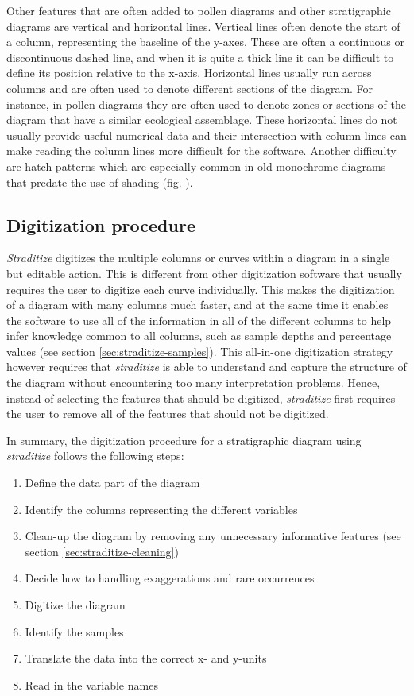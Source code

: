 \documentclass[
11pt, %
english, %
singlespacing, %
headsepline, %
]{MastersDoctoralThesis} %
\begin{document}
\begin{NoHyper}
\begin{refsection}
Other features that are often added to pollen diagrams and other stratigraphic diagrams are vertical and horizontal lines. Vertical lines often denote the start of a column, representing the baseline of the y-axes. These are often a continuous or discontinuous dashed line, and when it is quite a thick line it can be difficult to define its position relative to the x-axis. Horizontal lines usually run across columns and are often used to denote different sections of the diagram. For instance, in pollen diagrams they are often used to denote zones or sections of the diagram that have a similar ecological assemblage. These horizontal lines do not usually provide useful numerical data and their intersection with column lines can make reading the column lines more difficult for the software. Another difficulty are hatch patterns which are especially common in old monochrome diagrams that predate the use of shading (fig. \samplediagram[m]). 


\subsection{Digitization procedure}  \label{sec:straditize-digitization}
\emph{Straditize} digitizes the multiple columns or curves within a diagram in a single but editable action. This is different from other digitization software that usually requires the user to digitize each curve individually. This makes the digitization of a diagram with many columns much faster, and at the same time it enables the software to use all of the information in all of the different columns to help infer knowledge common to all columns, such as sample depths and percentage values (see section \ref{sec:straditize-samples}). This all-in-one digitization strategy however requires that \emph{straditize} is able to understand and capture the structure of the diagram without encountering too many interpretation problems. Hence, instead of selecting the features that should be digitized, \emph{straditize} first requires the user to remove all of the features that should not be digitized.

In summary, the digitization procedure for a stratigraphic diagram using \emph{straditize} follows the following steps:

\begin{enumerate}
	\item Define the data part of the diagram
	\item Identify the columns representing the different variables
	\item Clean-up the diagram by removing any unnecessary informative features (see section \ref{sec:straditize-cleaning}) 
	\item Decide how to handling exaggerations and rare occurrences
	\item Digitize the diagram
	\item Identify the samples
	\item Translate the data into the correct x- and y-units
	\item Read in the variable names
\end{enumerate}


\end{refsection}
\end{NoHyper}
\end{document}
